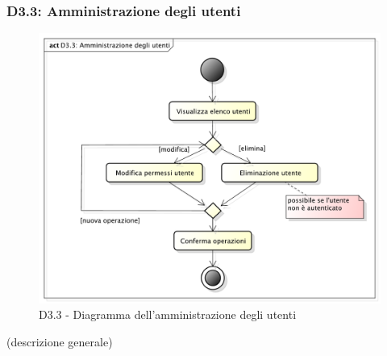 		\subsubsection{D3.3: Amministrazione degli utenti} %
		\label{ssub:amministrazione_degli_utenti}
		\begin{figure}[!htbp]
			\centering
			\centerline{\includegraphics[scale=0.45]{./images/D3_3.pdf}}
			\caption{D3.3 - Diagramma dell'amministrazione degli utenti}
		\end{figure}
		\noindent
		[TO DO] (descrizione generale)








